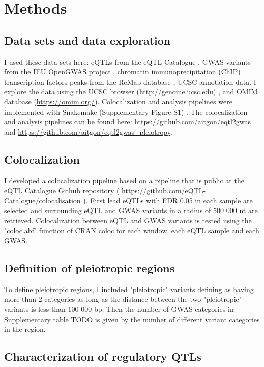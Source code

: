 \section{Methods}\label{sec:methods}

\subsection*{Data sets and data exploration}

I used these data sets here: eQTLs from the eQTL Catalogue \citep{2021.Alasoo.Kerimov}, GWAS variants from the IEU OpenGWAS project \citep{2021.Marcora.Lyon}, chromatin immunoprecipitation (ChIP)	transcription factors peaks from the ReMap database \citep{2021.Ballester.Hammal}, UCSC annotation data.
%
I explore the data using the UCSC browser (\url{http://genome.ucsc.edu}) \citep{2021.Kent.Lee}, and OMIM database (\url{https://omim.org/}).
%
Colocalization and analysis pipelines were implemented with Snakemake (Supplementary Figure S1) .
%
The colocalization and analysis pipelines can be found here: \url{https://github.com/aitgon/eqtl2gwas} and \url{https://github.com/aitgon/eqtl2gwas_pleiotropy}.

\subsection*{Colocalization}

I developed a colocalization pipeline based on a pipeline that is public at the eQTL Catalogue Github repository ( \url{https://github.com/eQTL-Catalogue/colocalisation} ).
%
First lead eQTLs with FDR 0.05 in each sample are selected and surrounding eQTL and GWAS variants in a radius of 500 000 nt are retrieved.
%
Colocalization between eQTL and GWAS variants is tested using the "coloc.abf" function of CRAN coloc for each window, each eQTL sample and each GWAS.

\subsection*{Definition of pleiotropic regions}

To define pleiotropic regions, I included "pleiotropic" variants defining as having more than 2 categories as long as the distance between the two "pleiotropic" variants is less than 100 000 bp.
%
Then the number of GWAS categories in Supplementary table TODO is given by the number of different variant categories in the region.

\subsection*{Characterization of regulatory QTLs}


